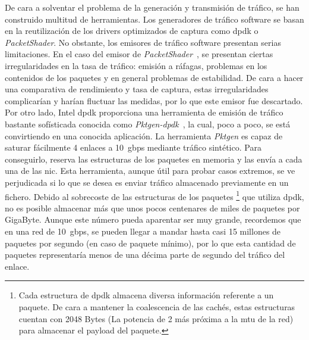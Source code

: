 De cara a solventar el problema de la generación y transmisión de tráfico, se han construido multitud de herramientas. Los generadores de tráfico software se basan en la reutilización de los drivers optimizados de captura como \gls{dpdk} o \textit{PacketShader}. No obstante, los emisores de tráfico software presentan serias limitaciones.
%
En el caso del emisor de \textit{PacketShader}~\cite{dpdk:packetshader}, se presentan ciertas irregularidades en la tasa de tráfico: emisión a ráfagas, problemas en los contenidos de los paquetes y en general problemas de estabilidad. De cara a hacer una comparativa de rendimiento y tasa de captura, estas irregularidades complicarían y harían fluctuar las medidas, por lo que este emisor fue descartado.
%
Por otro lado, Intel \gls{dpdk} proporciona una herramienta de emisión de tráfico bastante sofísticada conocida como \textit{Pktgen-\gls{dpdk}}~\cite{bib:dpdkpktgen}, la cual, poco a poco, se está convirtiendo en una conocida aplicación. 
La herramienta \textit{Pktgen} es capaz de saturar fácilmente 4 enlaces a 10~\gls{gbps} mediante tráfico sintético. Para conseguirlo, reserva las estructuras de los paquetes en memoria y las envía a cada una de las \gls{nic}. Esta herramienta, aunque útil para probar casos extremos, se ve perjudicada si lo que se desea es enviar tráfico almacenado previamente en un fichero. Debido al sobrecoste de las estructuras de los paquetes%
\footnote{Cada estructura de \gls{dpdk} almacena diversa información referente a un paquete. De cara a mantener la coalescencia de las cachés, estas estructuras cuentan con 2048 Bytes (La potencia de 2 más próxima a la \gls{mtu} de la red) para almacenar el payload del paquete.}%
 que utiliza \gls{dpdk}, no es posible almacenar más que unos pocos centenares de miles de paquetes por GigaByte. Aunque este número pueda aparentar ser muy grande, recordemos que en una red de 10~\gls{gbps}, se pueden llegar a mandar hasta casi 15 millones de paquetes por segundo (en caso de paquete mínimo), por lo que esta cantidad de paquetes representaría menos de una décima parte de segundo del tráfico del enlace.
 
